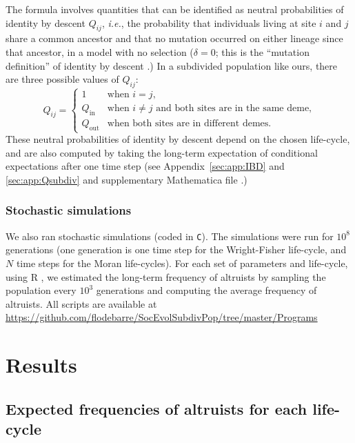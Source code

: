 \documentclass[11pt, letterpaper]{article}
\newcommand{\ie}{\textit{i.e.}}
\newcommand{\appname}[0]{Appendix}
\newcommand{\inn}{\textrm{in}}
\newcommand{\out}{\textrm{out}}
\newcommand{\Qin}{Q_{\inn}}
\newcommand{\Qout}{Q_{\out}}
\newcommand{\selstr}{\delta}
\begin{document}
The formula involves quantities that can be identified as neutral probabilities of identity by descent $Q_{ij}$, \ie, the probability that individuals living at site $i$  and $j$ share a common ancestor and that no mutation occurred on either lineage since that ancestor, in a model with no selection ($\selstr=0$; this is the ``mutation definition'' of identity by descent \citep{RoussetBilliard2000}.) 
In a subdivided population like ours, there are three possible values of $Q_{ij}$:
%
\begin{equation}\label{eq:Q3}
Q_{ij} = \begin{cases} 1 & \textrm{when $i=j$,} \\
\Qin & \textrm{when $i\neq j$ and both sites are in the same deme,}\\
\Qout & \textrm{when both sites are in different demes.}
\end{cases}
\end{equation}
%
These neutral probabilities of identity by descent depend on the chosen life-cycle, and are also computed by taking the long-term expectation of conditional expectations after one time step (see \appname~\ref{sec:app:IBD} and \ref{sec:app:Qsubdiv} and supplementary Mathematica file \citep{Mathematica11}.) 

\subsubsection{Stochastic simulations}
We also ran stochastic simulations (coded in \texttt{C}). The simulations were run for $10^8$ generations (one generation is one time step for the Wright-Fisher life-cycle, and $N$ time steps for the Moran life-cycles). For each set of parameters and life-cycle, using R \citep{R2015}, we estimated the long-term frequency of altruists by sampling the population every $10^3$ generations and computing the average frequency of altruists. 
%
All scripts are available at \\
{\small \url{https://github.com/flodebarre/SocEvolSubdivPop/tree/master/Programs}} 

\section{Results}


\subsection{Expected frequencies of altruists for each life-cycle}
\end{document}
